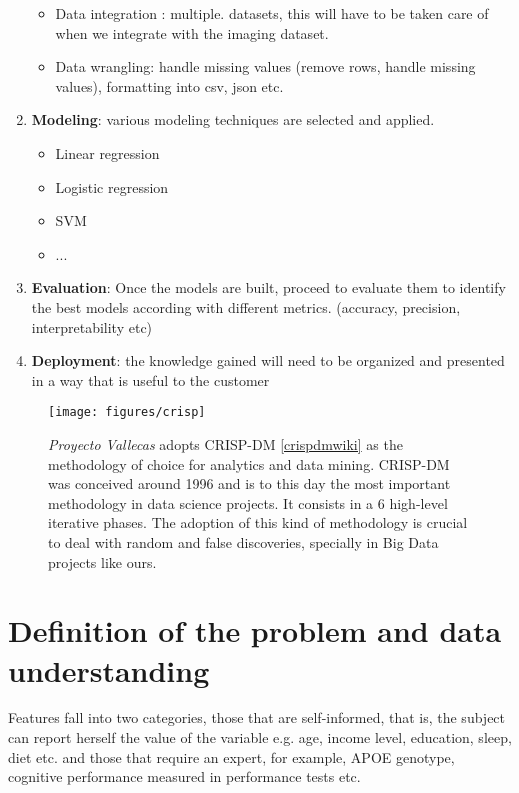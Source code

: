 \documentclass[11pt]{article}
\begin{document}
\begin{enumerate}
\begin{itemize}
		\item Data integration : multiple. datasets, this will have to be taken care of when we integrate with the imaging dataset.
		\item Data wrangling: handle missing values (remove rows, handle missing values), formatting into csv, json etc.
	\end{itemize}
\item \textbf{Modeling}: various modeling techniques are selected and applied.
	\begin{itemize}
		\item Linear regression 
		\item Logistic regression
		\item SVM
		\item ...
	\end{itemize}
\item \textbf{Evaluation}: Once the models are built, proceed to evaluate them to identify the best models according with different metrics. (accuracy, precision, interpretability etc)
\item \textbf{Deployment}: the knowledge gained will need to be organized and presented in a way that is useful to the customer
\end{enumerate}


\begin{figure}[h!]
        \centering
        \texttt{[image: figures/crisp]}
        \caption{\emph{Proyecto Vallecas} adopts CRISP-DM \ref{crispdmwiki} as the methodology of choice for analytics and data mining. CRISP-DM was conceived around 1996  and is to this day the most important methodology in data science projects. It consists in a 6 high-level iterative phases. The adoption of this kind of methodology is crucial to deal with random and false discoveries, specially in Big Data projects like ours.}
\label{fig:tableclustervallecas}
\end{figure}

\section{Definition of the problem and data understanding}
\label{se:biz}

Features fall into two categories, those that are self-informed, that is, the subject can report herself the value of the variable e.g. age, income level, education, sleep, diet etc. and those that require an expert, for example, APOE genotype, cognitive performance measured in performance tests etc.
\end{document}
